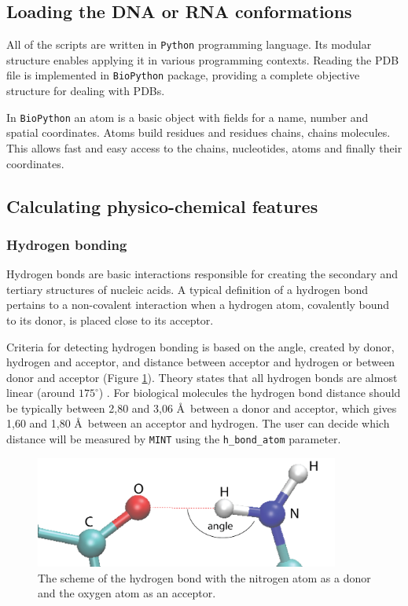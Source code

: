 \documentclass[12pt]{article}
\begin{document}
\newpage
\subsection{Loading the DNA or RNA conformations}
All of the scripts are written in {\tt Python} programming language. Its modular structure enables applying it in various programming contexts. Reading the PDB file is implemented in {\tt BioPython} package, providing a complete objective structure for dealing with PDBs. 

In {\tt BioPython} an atom is a basic object with fields for a name, number and spatial coordinates. Atoms build residues and residues chains, chains molecules. This allows fast and easy access to the chains, nucleotides, atoms and finally their coordinates.

\subsection{Calculating physico-chemical features}
\subsubsection{Hydrogen bonding} \label{Hbond-section}
Hydrogen bonds are basic interactions responsible for creating the secondary and tertiary structures of nucleic acids. A typical definition of a hydrogen bond pertains to a non-covalent interaction when a hydrogen atom, covalently bound to its donor, is placed close to its acceptor.

Criteria for detecting hydrogen bonding is based on the angle, created by donor, hydrogen and acceptor, and distance between acceptor and hydrogen or between donor and acceptor (Figure \ref{hbond}). Theory states that all hydrogen bonds are almost linear (around $175^\circ$) \cite{Guerra2000}. For biological molecules the hydrogen bond distance should be typically between 2,80 and 3,06 \AA\ between a donor and acceptor, which gives 1,60 and 1,80 \AA\ between an acceptor and hydrogen. The user can decide which distance will be measured by {\tt MINT} using the {\tt h\_bond\_atom} parameter.

\begin{figure}[h!btp]
\centering
\includegraphics[width = 10cm]{./pictures/hydrogen_bond_2.png}
\caption{The scheme of the hydrogen bond with the nitrogen atom as a donor and the oxygen atom as an acceptor.}
\label{hbond}
\end{figure}
\end{document}
